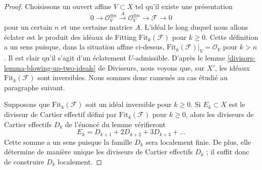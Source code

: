 \begin{proof}
Choisissons un ouvert affine $V \subset X$ tel qu'il existe une présentation
$$
0 \to \mathcal{O}_V^{\oplus n} \xrightarrow{A} \mathcal{O}_V^{\oplus n} \to
\mathcal{F} \to 0
$$
pour un certain $n$ et une certaine matrice $A$. L'idéal le long duquel nous allons éclater
est le produit des idéaux de Fitting $\text{Fit}_k(\mathcal{F})$
pour $k \geq 0$. Cette définition a un sens puisque, dans la situation affine
ci-dessus, $\text{Fit}_k(\mathcal{F})|_V = \mathcal{O}_V$
pour $k > n$. Il est clair qu'il s'agit d'un éclatement $U$-admissible. D'après
le lemme \ref{divisors-lemma-blowing-up-two-ideals} de Diviseurs,
nous voyons que, sur $X'$, les idéaux $\text{Fit}_k(\mathcal{F})$ sont inversibles.
Nous sommes donc ramenés au cas étudié au
paragraphe suivant.

\medskip\noindent
Supposons que $\text{Fit}_k(\mathcal{F})$ soit un idéal inversible pour
$k \geq 0$. Si $E_k \subset X$ est le diviseur de Cartier
effectif défini par $\text{Fit}_k(\mathcal{F})$
pour $k \geq 0$, alors les diviseurs de Cartier effectifs
$D_k$ de l'énoncé du lemme vérifieront
$$
E_k = D_{k + 1} + 2 D_{k + 2} + 3 D_{k + 3} + \ldots
$$
Cette somme a un sens puisque la famille $D_k$ sera localement finie.
De plus, elle détermine de manière unique les diviseurs de Cartier effectifs $D_k$ ;
il suffit donc de construire $D_k$ localement.


\end{proof}
